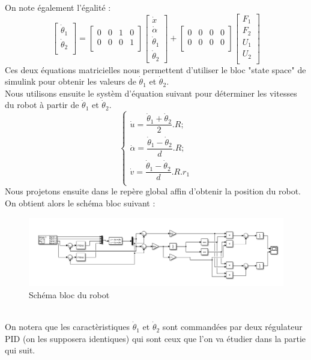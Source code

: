 \documentclass[a4paper]{article}
\begin{document}
	On note également l'égalité :
	\begin{equation}
	\begin{bmatrix}
	\dot{\theta}_{1} \\
	\dot{\theta}_{2} \\
	\end{bmatrix}
	=
	\begin{bmatrix}
	0 & 0 & 1 & 0 \\
	0 & 0 & 0 & 1 \\
	\end{bmatrix}
	\begin{bmatrix}
	\dot{x} \\
	\dot{\alpha} \\
	\dot{\theta}_{1} \\
	\dot{\theta}_{2}
	\end{bmatrix}
	+ 
	\begin{bmatrix}
	0 & 0 & 0 & 0 \\
	0 & 0 & 0 & 0 \\
	\end{bmatrix}
	\begin{bmatrix}
	F_{1} \\
	F_{2} \\
	U_{1} \\
	U_{2} \\
	\end{bmatrix}
	\end{equation}
	Ces deux équations matricielles nous permettent d'utiliser le bloc "state space" de simulink pour obtenir les valeurs de $\dot{\theta}_{1}$ et $\dot{\theta}_{2}$. \\
	
	Nous utilisons ensuite le systèm d'équation suivant pour déterminer les vitesses du robot à partir de $\dot{\theta}_{1}$ et $\dot{\theta}_{2}$.
	$$
	\begin{cases}
	\dot{u} = \dfrac{\dot{\theta}_{1}+\dot{\theta}_{2}}{2}.R;\\
	\dot{\alpha} = \dfrac{\dot{\theta}_{1}-\dot{\theta}_{2}}{d}.R;\\
	\dot{v} = \dfrac{\dot{\theta}_{1}-\dot{\theta}_{2}}{d}.R.r_{1}\\
	\end{cases}
	$$
	\newpage
	Nous projetons ensuite dans le repère global affin d'obtenir la position du robot.
	On obtient alors le schéma bloc suivant :
	\begin{figure}[h]
		\centering
		\includegraphics[width = 13cm]{Khepera.png}
		\caption{Schéma bloc du robot}
	\end{figure}
	\\
	On notera que les caractèristiques $\dot{\theta}_{1}$ et $\dot{\theta}_{2}$ sont commandées par deux régulateur PID (on les supposera identiques) qui sont ceux que l'on va étudier dans la partie qui suit.
	
\end{document}
